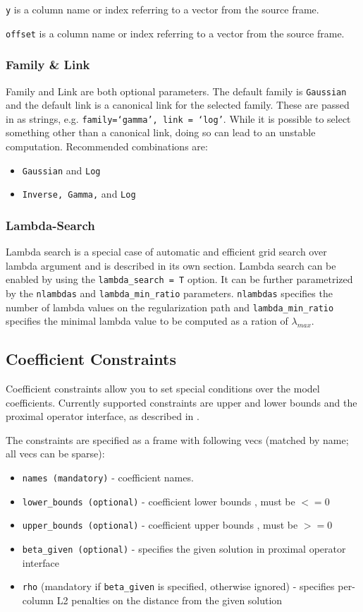 \texttt{y} is a column name or index referring to a vector from the source frame.

\texttt{offset} is a column name or index referring to a vector from the source frame.
  
\subsubsection{Family \& Link}
Family and Link are both optional parameters. The default family is \texttt{Gaussian} and the default link is a canonical link for the selected family. These are passed in as strings, e.g. \texttt{family=`gamma', link = `log'}.
While it is possible to select something other than a canonical link, doing so can lead to an unstable computation. Recommended combinations are: 
\begin{itemize}
\item \texttt{Gaussian} and \texttt{Log}
\item \texttt{Inverse, Gamma,} and \texttt{Log}
\end{itemize} 

\subsubsection{Lambda-Search}
Lambda search is a special case of automatic and efficient grid search over lambda argument and is described in its own section. Lambda search can be enabled by using the \texttt{lambda\_search = T} option. It can be further parametrized by the \texttt{nlambdas} and \texttt{lambda\_min\_ratio} parameters. 
\texttt{nlambdas} specifies the number of lambda values on the regularization path and \texttt{lambda\_min\_ratio} specifies the minimal lambda value to be computed as a ration of $\lambda_{max}$.

\subsection{Coefficient Constraints}
Coefficient constraints allow you to set special conditions over the model coefficients. Currently supported constraints are upper and lower bounds and the proximal operator interface, as described in .

The constraints are specified as a frame with following vecs (matched by name; all vecs can be sparse):
\begin{itemize}
\item \texttt{names (mandatory)}  - coefficient names. 
\item \texttt{lower\_bounds (optional)} - coefficient lower bounds , must be $<= 0$
\item \texttt{upper\_bounds (optional)} - coefficient upper bounds , must be $>= 0$
\item \texttt{beta\_given (optional)} - specifies the given solution in proximal operator interface
\item \texttt{rho} (mandatory if \texttt{beta\_given} is specified, otherwise ignored) - specifies per-column L2 penalties on the distance from the given solution
\end{itemize}
 
